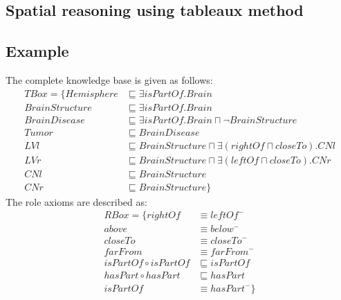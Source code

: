\documentclass{article}
\begin{document}
\subsection{Spatial reasoning using tableaux method}
\subsection{Example}
 The complete knowledge base is given as follows:
\begin{align*}
 TBox=\{ Hemisphere &\sqsubseteq \exists isPartOf. Brain\\
	 BrainStructure &\sqsubseteq \exists isPartOf. Brain\\
	 BrainDisease &\sqsubseteq \exists isPartOf. Brain \sqcap \neg BrainStructure\\
	 Tumor  &\sqsubseteq BrainDisease\\
	 LVl &\sqsubseteq BrainStructure \sqcap \exists (rightOf \sqcap closeTo). CNl\\
	 LVr &\sqsubseteq BrainStructure \sqcap \exists (leftOf \sqcap closeTo). CNr\\
	 CNl &\sqsubseteq BrainStructure\\
	 CNr &\sqsubseteq BrainStructure\}
\end{align*}
The role axioms are described as:
\begin{align*}
 RBox=\{ rightOf &\equiv leftOf^-\\
         above &\equiv below^- \\
	 closeTo &\equiv closeTo^- \\
	 farFrom &\equiv farFrom^- \\
	 isPartOf \circ isPartOf &\sqsubseteq isPartOf \\
	 hasPart \circ hasPart &\sqsubseteq hasPart\\
	 isPartOf &\equiv hasPart^-\}
\end{align*}
\end{document}
